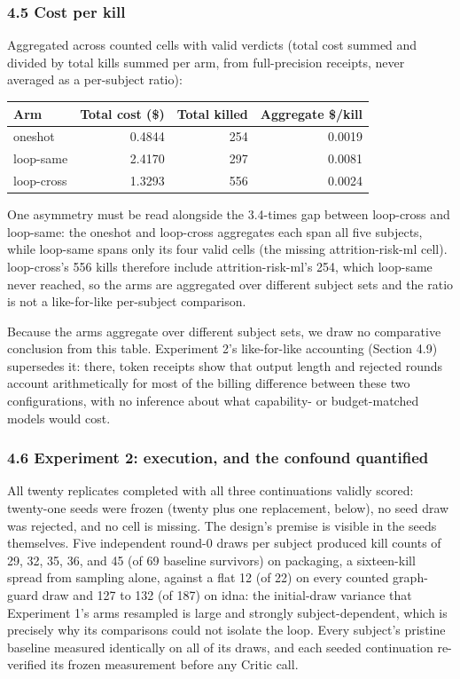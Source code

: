 \documentclass[
  11pt,
]{article}
\newcounter{none} %
\begin{document}
\subsubsection{4.5 Cost per kill}\label{cost-per-kill}

Aggregated across counted cells with valid verdicts (total cost summed
and divided by total kills summed per arm, from full-precision receipts,
never averaged as a per-subject ratio):

{\def\LTcaptype{none} %
\begin{longtable}[]{@{}lrrr@{}}
\toprule\noalign{}
Arm & Total cost (\$) & Total killed & Aggregate \$/kill \\
\midrule\noalign{}
\endhead
\bottomrule\noalign{}
\endlastfoot
oneshot & 0.4844 & 254 & 0.0019 \\
loop-same & 2.4170 & 297 & 0.0081 \\
loop-cross & 1.3293 & 556 & 0.0024 \\
\end{longtable}
}

One asymmetry must be read alongside the 3.4-times gap between
loop-cross and loop-same: the oneshot and loop-cross aggregates each
span all five subjects, while loop-same spans only its four valid cells
(the missing attrition-risk-ml cell). loop-cross's 556 kills therefore
include attrition-risk-ml's 254, which loop-same never reached, so the
arms are aggregated over different subject sets and the ratio is not a
like-for-like per-subject comparison.

Because the arms aggregate over different subject sets, we draw no
comparative conclusion from this table. Experiment 2's like-for-like
accounting (Section 4.9) supersedes it: there, token receipts show that
output length and rejected rounds account arithmetically for most of the
billing difference between these two configurations, with no inference
about what capability- or budget-matched models would cost.

\subsubsection{4.6 Experiment 2: execution, and the confound
quantified}\label{experiment-2-execution-and-the-confound-quantified}

All twenty replicates completed with all three continuations validly
scored: twenty-one seeds were frozen (twenty plus one replacement,
below), no seed draw was rejected, and no cell is missing. The design's
premise is visible in the seeds themselves. Five independent round-0
draws per subject produced kill counts of 29, 32, 35, 36, and 45 (of 69
baseline survivors) on packaging, a sixteen-kill spread from sampling
alone, against a flat 12 (of 22) on every counted graph-guard draw and
127 to 132 (of 187) on idna: the initial-draw variance that Experiment
1's arms resampled is large and strongly subject-dependent, which is
precisely why its comparisons could not isolate the loop. Every
subject's pristine baseline measured identically on all of its draws,
and each seeded continuation re-verified its frozen measurement before
any Critic call.
\end{document}
